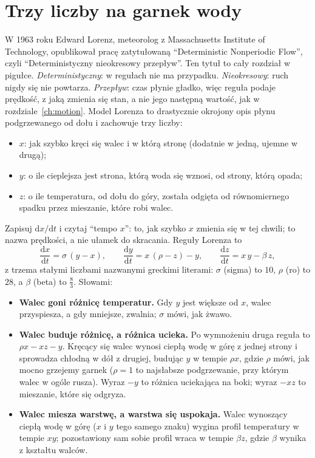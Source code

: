 \section{Trzy liczby na garnek wody}
\label{sec:ch09-rules}

\noindent
W 1963 roku Edward Lorenz, meteorolog z Massachusetts Institute of
Technology, opublikował pracę zatytułowaną \enquote{Deterministic Nonperiodic
Flow}, czyli \enquote{Deterministyczny nieokresowy przepływ}. Ten tytuł to
cały rozdział w pigułce. \emph{Deterministyczny}: w regułach nie ma
przypadku. \emph{Nieokresowy}: ruch nigdy się nie powtarza.
\emph{Przepływ}: czas płynie gładko, więc reguła podaje prędkość, z jaką
zmienia się stan, a nie jego następną wartość, jak w
rozdziale~\ref{ch:motion}. Model Lorenza to drastycznie okrojony opis płynu
podgrzewanego od dołu i zachowuje trzy liczby:

\begin{itemize}
\item $x$: jak szybko kręci się walec i w którą stronę (dodatnie w jedną,
  ujemne w drugą);
\item $y$: o ile cieplejsza jest strona, którą woda się wznosi, od strony,
  którą opada;
\item $z$: o ile temperatura, od dołu do góry, została odgięta od
  równomiernego spadku przez mieszanie, które robi walec.
\end{itemize}

\noindent
Zapisuj $\mathrm{d}x/\mathrm{d}t$ i czytaj \enquote{tempo $x$}: to, jak
szybko $x$ zmienia się w tej chwili; to nazwa prędkości, a nie ułamek do
skracania. Reguły Lorenza to
\[
\frac{\mathrm{d}x}{\mathrm{d}t} = \sigma\,(y - x), \qquad
\frac{\mathrm{d}y}{\mathrm{d}t} = x\,(\rho - z) - y, \qquad
\frac{\mathrm{d}z}{\mathrm{d}t} = x\,y - \beta\,z,
\]
z trzema stałymi liczbami nazwanymi greckimi literami: $\sigma$ (sigma) to
$10$, $\rho$ (ro) to $28$, a $\beta$ (beta) to $\tfrac{8}{3}$. Słowami:

\begin{itemize}
\item \textbf{Walec goni różnicę temperatur.} Gdy $y$ jest większe od $x$, walec
  przyspiesza, a gdy mniejsze, zwalnia; $\sigma$ mówi, jak żwawo.
\item \textbf{Walec buduje różnicę, a różnica ucieka.} Po wymnożeniu druga
  reguła to $\rho x - xz - y$. Kręcący się walec wynosi ciepłą wodę w górę z
  jednej strony i sprowadza chłodną w dół z drugiej, budując $y$ w tempie
  $\rho x$, gdzie $\rho$ mówi, jak mocno grzejemy garnek ($\rho = 1$ to
  najsłabsze podgrzewanie, przy którym walec w ogóle rusza). Wyraz $-y$ to różnica
  uciekająca na boki; wyraz $-xz$ to mieszanie, które się odgryza.
\item \textbf{Walec miesza warstwę, a warstwa się uspokaja.} Walec wynoszący
  ciepłą wodę w górę ($x$ i $y$ tego samego znaku) wygina profil temperatury w
  tempie $xy$; pozostawiony sam sobie profil wraca w tempie $\beta z$, gdzie
  $\beta$ wynika z kształtu walców.
\end{itemize}

